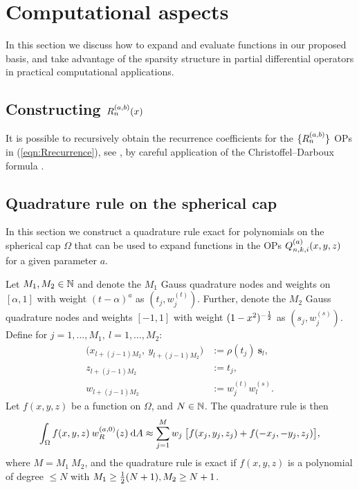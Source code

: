 \documentclass[11pt, oneside]{article}   	%
\begin{document}
%
\section{Computational aspects}\label{Section:Computation}

In this section we discuss how to expand and evaluate functions in our proposed basis, and take advantage of the sparsity structure in partial differential operators in practical computational applications.


\subsection{Constructing $R_n^{(a,b)}(x)$}

It is possible to recursively obtain the recurrence coefficients for the $\{R_n^{(a,b)}\}$ OPs in (\ref{eqn:Rrecurrence}), see \cite{snowball2019sparse}, by careful application of the Christoffel--Darboux formula \cite[18.2.12]{DLMF}.


\subsection{Quadrature rule on the spherical cap}\label{subsection:quadrule}

In this section we construct a quadrature rule exact for polynomials on the spherical cap $\Omega$ that can be used to expand functions in the OPs $Q_{n,k,i}^{(a)}(x,y,z)$ for a given parameter $a$.

\begin{theorem}\label{Theorem:quadrule}
Let $M_1, M_2 \in \mathbb{N}$ and denote the $M_1$ Gauss quadrature nodes and weights on $[\alpha,1]$ with weight $(t - \alpha)^a$ as $(t_j, w_j^{(t)})$. Further, denote the $M_2$ Gauss quadrature nodes and weights $[-1,1]$ with weight $(1 - x^2)^{-\frac{1}{2}}$ as $(s_j, w_j^{(s)})$.
Define for $j = 1,\dots,M_1, \: l=1,\dots,M_2$:
\begin{align*}
	\big(x_{l+(j-1)M_2}, \: y_{l+(j-1)M_2} \big) &:= \rho(t_j) \: \mathbf{s}_l, \\
	z_{l+(j-1)M_2} &:= t_j, \\
	w_{l+(j-1)M_2} &:= w_j^{(t)} w_l^{(s)}.
\end{align*}
Let $f(x,y,z)$ be a function on $\Omega$, and $N \in \mathbb{N}$. The quadrature rule is then
\begin{align*}
	\int_\Omega f(x,y,z) \: w_R^{(a,0)}(z) \: {\rm d} A \approx \sum_{j=1}^{M} w_j \: \big[ f(x_j, y_j, z_j) + f(-x_j, -y_j, z_j) \big],
\end{align*}
where $M = M_1 \: M_2$, and the quadrature rule is exact if $f(x,y,z)$ is a polynomial of degree $\le N$ with $M_1 \ge \frac{1}{2} (N+1), M_2 \ge N+1$.
\end{theorem}
\end{document}
